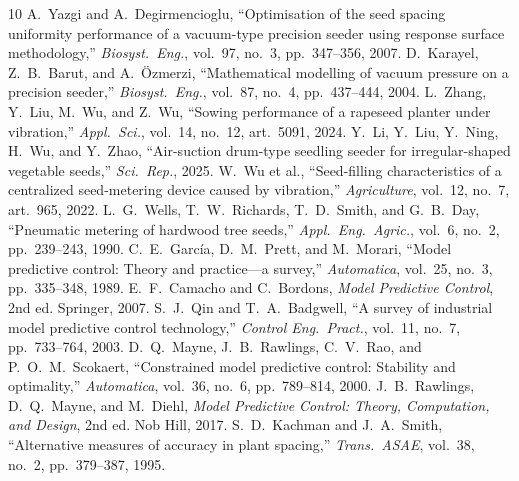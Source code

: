 \documentclass[11pt,a4paper]{article}
\begin{document}
\begin{thebibliography}{10}
 A.~Yazgi and A.~Degirmencioglu, ``Optimisation of the seed spacing uniformity performance of a vacuum-type precision seeder using response surface methodology,'' \emph{Biosyst.\ Eng.}, vol.~97, no.~3, pp.~347--356, 2007.
 D.~Karayel, Z.~B.~Barut, and A.~\"Ozmerzi, ``Mathematical modelling of vacuum pressure on a precision seeder,'' \emph{Biosyst.\ Eng.}, vol.~87, no.~4, pp.~437--444, 2004.
 L.~Zhang, Y.~Liu, M.~Wu, and Z.~Wu, ``Sowing performance of a rapeseed planter under vibration,'' \emph{Appl.\ Sci.}, vol.~14, no.~12, art.~5091, 2024.
 Y.~Li, Y.~Liu, Y.~Ning, H.~Wu, and Y.~Zhao, ``Air-suction drum-type seedling seeder for irregular-shaped vegetable seeds,'' \emph{Sci.\ Rep.}, 2025.
 W.~Wu et al., ``Seed-filling characteristics of a centralized seed-metering device caused by vibration,'' \emph{Agriculture}, vol.~12, no.~7, art.~965, 2022.
 L.~G.~Wells, T.~W.~Richards, T.~D.~Smith, and G.~B.~Day, ``Pneumatic metering of hardwood tree seeds,'' \emph{Appl.\ Eng.\ Agric.}, vol.~6, no.~2, pp.~239--243, 1990.
 C.~E.~Garc\'ia, D.~M.~Prett, and M.~Morari, ``Model predictive control: Theory and practice---a survey,'' \emph{Automatica}, vol.~25, no.~3, pp.~335--348, 1989.
 E.~F.~Camacho and C.~Bordons, \emph{Model Predictive Control}, 2nd ed. Springer, 2007.
 S.~J.~Qin and T.~A.~Badgwell, ``A survey of industrial model predictive control technology,'' \emph{Control Eng.\ Pract.}, vol.~11, no.~7, pp.~733--764, 2003.
 D.~Q.~Mayne, J.~B.~Rawlings, C.~V.~Rao, and P.~O.~M.~Scokaert, ``Constrained model predictive control: Stability and optimality,'' \emph{Automatica}, vol.~36, no.~6, pp.~789--814, 2000.
 J.~B.~Rawlings, D.~Q.~Mayne, and M.~Diehl, \emph{Model Predictive Control: Theory, Computation, and Design}, 2nd ed. Nob Hill, 2017.
 S.~D.~Kachman and J.~A.~Smith, ``Alternative measures of accuracy in plant spacing,'' \emph{Trans.\ ASAE}, vol.~38, no.~2, pp.~379--387, 1995.
\end{thebibliography}
\end{document}
